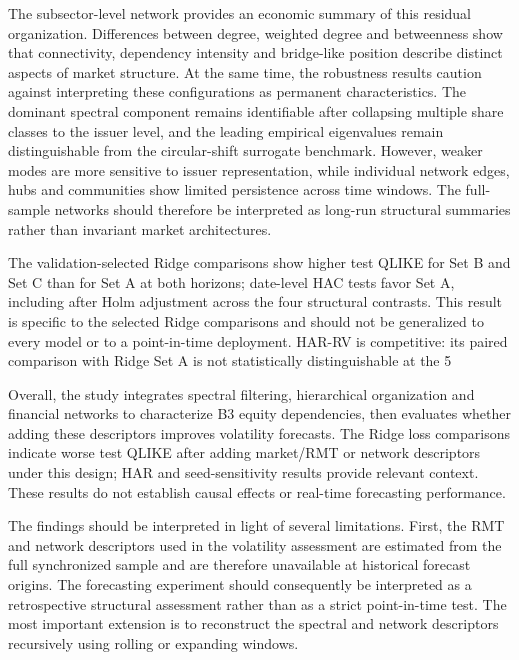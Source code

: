 The subsector-level network provides an economic summary of this residual organization. Differences between degree, weighted degree and betweenness show that connectivity, dependency intensity and bridge-like position describe distinct aspects of market structure. At the same time, the robustness results caution against interpreting these configurations as permanent characteristics. The dominant spectral component remains identifiable after collapsing multiple share classes to the issuer level, and the leading empirical eigenvalues remain distinguishable from the circular-shift surrogate benchmark. However, weaker modes are more sensitive to issuer representation, while individual network edges, hubs and communities show limited persistence across time windows. The full-sample networks should therefore be interpreted as long-run structural summaries rather than invariant market architectures.

The validation-selected Ridge comparisons show higher test QLIKE for Set B and Set C than for Set A at both horizons; date-level HAC tests favor Set A, including after Holm adjustment across the four structural contrasts. This result is specific to the selected Ridge comparisons and should not be generalized to every model or to a point-in-time deployment. HAR-RV is competitive: its paired comparison with Ridge Set A is not statistically distinguishable at the 5%

Overall, the study integrates spectral filtering, hierarchical organization and financial networks to characterize B3 equity dependencies, then evaluates whether adding these descriptors improves volatility forecasts. The Ridge loss comparisons indicate worse test QLIKE after adding market/RMT or network descriptors under this design; HAR and seed-sensitivity results provide relevant context. These results do not establish causal effects or real-time forecasting performance.

The findings should be interpreted in light of several limitations. First, the RMT and network descriptors used in the volatility assessment are estimated from the full synchronized sample and are therefore unavailable at historical forecast origins. The forecasting experiment should consequently be interpreted as a retrospective structural assessment rather than as a strict point-in-time test. The most important extension is to reconstruct the spectral and network descriptors recursively using rolling or expanding windows.

